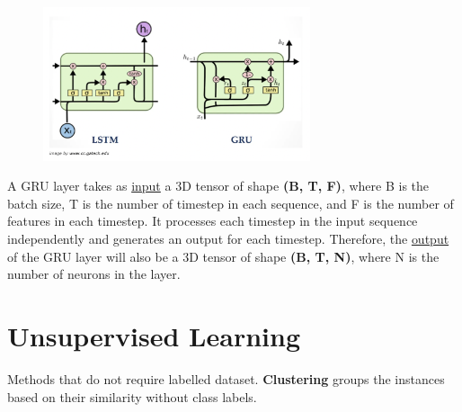 \documentclass[a4paper,10pt]{article}
\begin{document}
\vspace*{-0.3cm}
\begin{figure}[ht]
    \centering
    \includegraphics[width =0.7\textwidth]{LSTM_GRU.png}
\end{figure}

\par
A GRU layer takes as \underline{input} a 3D tensor of shape \textbf{(B, T, F)}, where B is the batch size, T is the number of timestep in each sequence, and F is the number of features in each timestep. It processes each timestep in the input sequence independently and generates an output for each timestep. Therefore, the \underline{output} of the GRU layer will also be a 3D tensor of shape \textbf{(B, T, N)}, where N is the number of neurons in the layer.

\section{Unsupervised Learning}
Methods that do not require labelled dataset. \textbf{Clustering} groups the instances based on their similarity without class labels.
\end{document}

